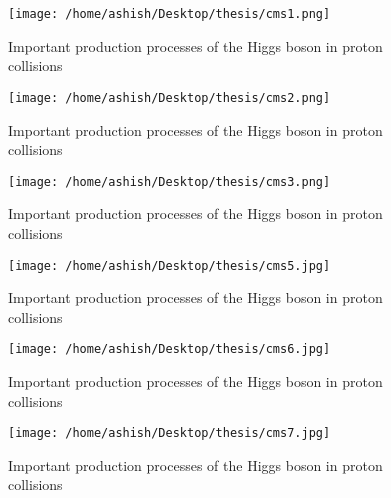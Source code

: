 \documentclass{article}
\begin{document}
\begin{figure}
  \centering
   \texttt{[image: /home/ashish/Desktop/thesis/cms1.png]}
  \caption{Important production processes of the Higgs boson in proton collisions}
   \label{figure 7}
\end{figure}

\begin{figure}
  \centering
   \texttt{[image: /home/ashish/Desktop/thesis/cms2.png]}
  \caption{Important production processes of the Higgs boson in proton collisions}
   \label{figure 8}
\end{figure}

\begin{figure}
  \centering
   \texttt{[image: /home/ashish/Desktop/thesis/cms3.png]}
  \caption{Important production processes of the Higgs boson in proton collisions}
   \label{figure 9}
\end{figure}

\begin{figure}
  \centering
   \texttt{[image: /home/ashish/Desktop/thesis/cms5.jpg]}
  \caption{Important production processes of the Higgs boson in proton collisions}
   \label{figure 10}
\end{figure}

\begin{figure}
  \centering
   \texttt{[image: /home/ashish/Desktop/thesis/cms6.jpg]}
  \caption{Important production processes of the Higgs boson in proton collisions}
   \label{figure 10}
\end{figure}

\begin{figure}
  \centering
   \texttt{[image: /home/ashish/Desktop/thesis/cms7.jpg]}
  \caption{Important production processes of the Higgs boson in proton collisions}
   \label{figure 11}
\end{figure}
\end{document}
